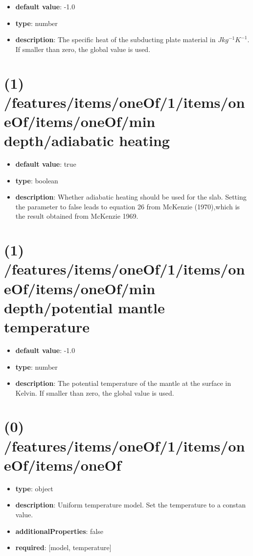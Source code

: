 \begin{itemize}[leftmargin=1em]\item {\bf default value}: -1.0
\item {\bf type}: number
\item {\bf description}: The specific heat of the subducting plate material in $J kg^{-1} K^{-1}$. If smaller than zero, the global value is used.
\end{itemize}\section{(1) /features/items/oneOf/1/items/oneOf/items/oneOf/min depth/adiabatic heating}
\begin{itemize}[leftmargin=1em]\item {\bf default value}: true
\item {\bf type}: boolean
\item {\bf description}: Whether adiabatic heating should be used for the slab. Setting the parameter to false leads to equation 26 from McKenzie (1970),which is the result obtained from McKenzie 1969.
\end{itemize}\section{(1) /features/items/oneOf/1/items/oneOf/items/oneOf/min depth/potential mantle temperature}
\begin{itemize}[leftmargin=1em]\item {\bf default value}: -1.0
\item {\bf type}: number
\item {\bf description}: The potential temperature of the mantle at the surface in Kelvin. If smaller than zero, the global value is used.
\end{itemize}\section{(0) /features/items/oneOf/1/items/oneOf/items/oneOf}
\begin{itemize}[leftmargin=0em]\item {\bf type}: object
\item {\bf description}: Uniform temperature model. Set the temperature to a constan value.
\item {\bf additionalProperties}: false
\item {\bf required}: [model, temperature]\end{itemize}
